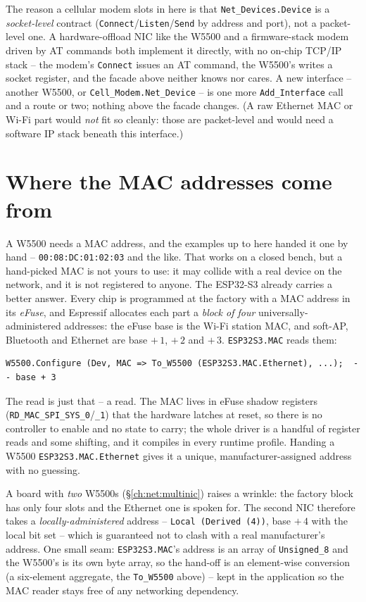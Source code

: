 The reason a cellular modem slots in here is that \texttt{Net\_Devices.Device} is a
\emph{socket-level} contract (\texttt{Connect}/\texttt{Listen}/\texttt{Send} by
address and port), not a packet-level one. A hardware-offload NIC like the W5500 and a
firmware-stack modem driven by AT commands both implement it directly, with no on-chip
TCP/IP stack -- the modem's \texttt{Connect} issues an AT command, the W5500's writes
a socket register, and the facade above neither knows nor cares. A new interface --
another W5500, or \texttt{Cell\_Modem.Net\_Device} -- is one more
\texttt{Add\_Interface} call and a route or two; nothing above the facade changes. (A
raw Ethernet MAC or Wi-Fi part would \emph{not} fit so cleanly: those are packet-level
and would need a software IP stack beneath this interface.)

\section{Where the MAC addresses come from}
\label{ch:net:mac}

A W5500 needs a MAC address, and the examples up to here handed it one by hand --
\texttt{00:08:DC:01:02:03} and the like. That works on a closed bench, but a
hand-picked MAC is not yours to use: it may collide with a real device on the network,
and it is not registered to anyone. The ESP32-S3 already carries a better answer. Every
chip is programmed at the factory with a MAC address in its \emph{eFuse}, and Espressif
allocates each part a \emph{block of four} universally-administered addresses: the eFuse
base is the Wi-Fi station MAC, and soft-AP, Bluetooth and Ethernet are base $+\,1$,
$+\,2$ and $+\,3$. \texttt{ESP32S3.MAC} reads them:

\begin{lstlisting}
W5500.Configure (Dev, MAC => To_W5500 (ESP32S3.MAC.Ethernet), ...);  -- base + 3
\end{lstlisting}

The read is just that -- a read. The MAC lives in eFuse shadow registers
(\texttt{RD\_MAC\_SPI\_SYS\_0}/\texttt{\_1}) that the hardware latches at reset, so there
is no controller to enable and no state to carry; the whole driver is a handful of
register reads and some shifting, and it compiles in every runtime profile. Handing a
W5500 \texttt{ESP32S3.MAC.Ethernet} gives it a unique, manufacturer-assigned address
with no guessing.

A board with \emph{two} W5500s (\S\ref{ch:net:multinic}) raises a wrinkle: the factory
block has only four slots and the Ethernet one is spoken for. The second NIC therefore
takes a \emph{locally-administered} address -- \texttt{Local (Derived (4))}, base
$+\,4$ with the local bit set -- which is guaranteed not to clash with a real
manufacturer's address. One small seam: \texttt{ESP32S3.MAC}'s address is an array of
\texttt{Unsigned\_8} and the W5500's is its own byte array, so the hand-off is an
element-wise conversion (a six-element aggregate, the \texttt{To\_W5500} above) -- kept
in the application so the MAC reader stays free of any networking dependency.

